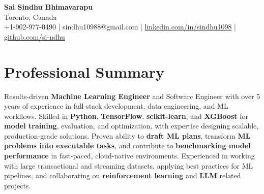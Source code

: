 \documentclass[letterpaper,11pt]{article}
\begin{document}
\begin{center}
  {\Large \textbf{Sai Sindhu Bhimavarapu}} \\
  Toronto, Canada \\
  +1-902-977-0490 \enspace | \enspace sindhu10988@gmail.com \enspace | \enspace \href{https://www.linkedin.com/in/sindhu1098/}{linkedin.com/in/sindhu1098} \enspace | \enspace \href{https://github.com/si-ndhu}{github.com/si-ndhu}
\end{center}

\section{Professional Summary}
  \begin{itemize}[leftmargin=0.15in, label={}]
    \small{\item{
     Results-driven \textbf{Machine Learning Engineer} and Software Engineer with over 5 years of experience in full-stack development, data engineering, and ML workflows. Skilled in \textbf{Python}, \textbf{TensorFlow}, \textbf{scikit-learn}, and \textbf{XGBoost} for \textbf{model training}, evaluation, and optimization, with expertise designing scalable, production-grade solutions. Proven ability to \textbf{draft ML plans}, transform \textbf{ML problems into executable tasks}, and contribute to \textbf{benchmarking model performance} in fast-paced, cloud-native environments. Experienced in working with large transactional and streaming datasets, applying best practices for ML pipelines, and collaborating on \textbf{reinforcement learning} and \textbf{LLM} related projects.
    }}
  \end{itemize}
\vspace{-16pt}

\end{document}
